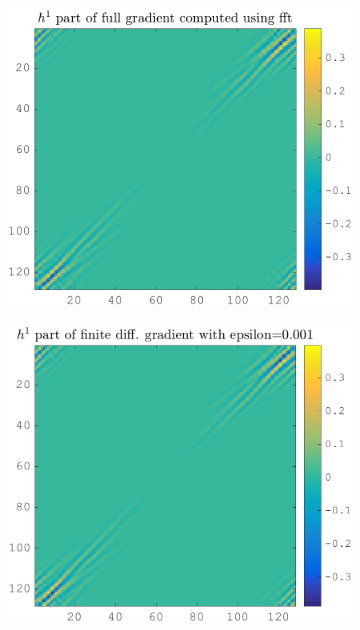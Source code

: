 \begin{figure}[!ht]\centering
\begin{subfigure}[b]{0.30\textwidth}\centering
\includegraphics[width=\textwidth]{figures/verif_gradient/gradient.png}
\end{subfigure}
\begin{subfigure}[b]{0.30\textwidth}\centering
\includegraphics[width=\textwidth]{figures/verif_gradient/finite-diff.png}
\end{subfigure}

\end{figure}
